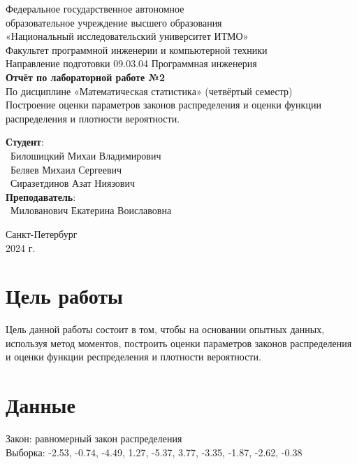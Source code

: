 \documentclass{article}
\begin{document}
\begin{center}
    \Large
    Федеральное государственное автономное \\
    образовательное учреждение высшего образования \\ 
    «Национальный исследовательский университет ИТМО»\\
    \vspace{0.5cm}
    \large
    Факультет программной инженерии и компьютерной техники \\
    Направление подготовки 09.03.04 Программная инженерия \\
    \vspace{1cm}
    \Large
    \textbf{Отчёт по лабораторной работе №2} \\
    По дисциплине «Математическая статистика» (четвёртый семестр)\\
    Построение оценки параметров законов распределения и оценки функции распределения и плотности вероятности.\\
    \large
    \vspace{8cm}

    \begin{minipage}{.33\textwidth}
    \end{minipage}
    \hfill
    \begin{minipage}{.4\textwidth}
    
        \textbf{Студент}: \vspace{.1cm} \\
        \ Билошицкий Михаи Владимирович\\
        \ Беляев Михаил Сергеевич\\
        \ Сиразетдинов Азат Ниязович\\
        \textbf{Преподаватель}:  \\
        \ Милованович Екатерина Воиславовна
    \end{minipage}
    \vfill
Санкт-Петербург\\ 2024 г.
\end{center}
\thispagestyle{empty}

\newpage
\section*{Цель работы}
Цель данной работы состоит в том, чтобы на основании опытных данных, используя метод моментов, построить оценки параметров законов распределения и оценки функции респределения и плотности вероятности.
\section*{Данные }
Закон: равномерный закон распределения\\
Выборка: -2.53, -0.74, -4.49, 1.27, -5.37, 3.77, -3.35, -1.87, -2.62, -0.38
\end{document}
